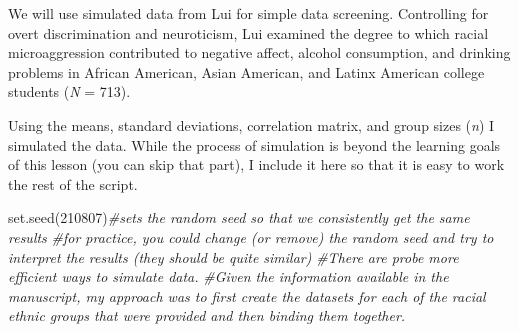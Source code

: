 \documentclass[
  english,
]{book}
\newenvironment{Shaded}{\begin{snugshade}}{\end{snugshade}}
\newcommand{\CommentTok}[1]{\textcolor[rgb]{0.56,0.35,0.01}{\textit{#1}}}
\newcommand{\DecValTok}[1]{\textcolor[rgb]{0.00,0.00,0.81}{#1}}
\newcommand{\FunctionTok}[1]{\textcolor[rgb]{0.00,0.00,0.00}{#1}}
\newcommand{\NormalTok}[1]{#1}
\begin{document}
We will use simulated data from Lui \citeyearpar{lui_racial_2020} for simple data screening. Controlling for overt discrimination and neuroticism, Lui examined the degree to which racial microaggression contributed to negative affect, alcohol consumption, and drinking problems in African American, Asian American, and Latinx American college students (\emph{N} = 713).

Using the means, standard deviations, correlation matrix, and group sizes (\emph{n}) I simulated the data. While the process of simulation is beyond the learning goals of this lesson (you can skip that part), I include it here so that it is easy to work the rest of the script.

\begin{Shaded}
\begin{Highlighting}[]
\FunctionTok{set.seed}\NormalTok{(}\DecValTok{210807}\NormalTok{)}\CommentTok{\#sets the random seed so that we consistently get the same results}
\CommentTok{\#for practice, you could change (or remove) the random seed and try to interpret the results (they should be quite similar)}
\CommentTok{\#There are probe more efficient ways to simulate data.}
\CommentTok{\#Given the information available in the manuscript, my approach was to first create the datasets for each of the racial ethnic groups that were provided and then binding them together.}


\end{Highlighting}
\end{Shaded}
\end{document}
